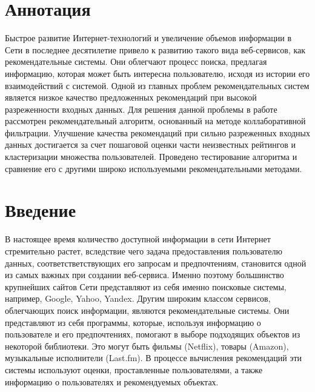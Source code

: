 \documentclass[a4paper, 12pt]{article} %
\begin{document}


\tableofcontents

\newpage
\section{Аннотация}
Быстрое развитие Интернет-технологий и увеличение объемов информации в Сети в последнее десятилетие привело к развитию такого вида веб-сервисов, как рекомендательные системы. Они облегчают процесс поиска, предлагая информацию, которая может быть интересна пользователю, исходя из истории его взаимодействий с системой. Одной из главных проблем рекомендательных систем является низкое качество предложенных рекомендаций при высокой разреженности входных данных. Для решения данной проблемы в работе рассмотрен рекомендательный алгоритм, основанный на методе коллаборативной фильтрации. Улучшение качества рекомендаций при сильно разреженных входных данных достигается за счет пошаговой оценки части неизвестных рейтингов и кластеризации множества пользователей. Проведено тестирование алгоритма и сравнение его с другими широко используемыми рекомендательными методами.

\newpage
\section{Введение}
В настоящее время количество доступной информации в сети Интернет стремительно растет, вследствие чего задача предоставления пользователю данных, соответстветствующих его запросам и предпочтениям, становится одной из самых важных при создании веб-сервиса. Именно поэтому большинство крупнейших сайтов Сети представляют из себя именно поисковые системы, например, Google, Yahoo, Yandex. Другим широким классом сервисов, облегчающих поиск информации, являются рекомендательные системы. Они представляют из себя программы, которые, используя информацию о пользователе и его предпочтениях, помогают в выборе подходящих объектов из некоторой библиотеки\cite{cfdef}.  Это могут быть фильмы (Netflix), товары (Amazon), музыкальные исполнители (Last.fm). В процессе вычисления рекомендаций эти системы используют оценки, проставленные пользователями, а также информацию о пользователях и рекомендуемых объектах. 
\end{document}
